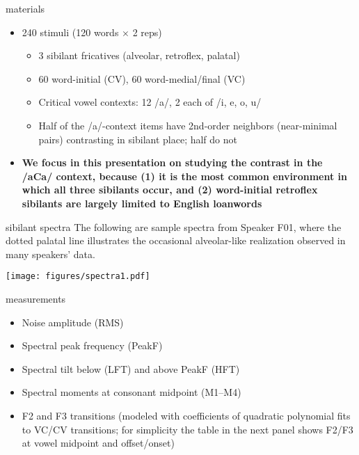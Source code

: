 \documentclass[serif, mathserif, final, xcolor=table]{beamer}
\begin{document}
\begin{frame}[t]{}
\begin{columns}[t]
\begin{column}{0.24\linewidth}
      \begin{block}{materials}
        \small
        \begin{itemize}
          \item 240 stimuli (120 words $\times$ 2 reps)
            \begin{itemize}
              \item 3 sibilant fricatives (alveolar, retroflex, palatal)
              \item 60 word-initial (CV), 60 word-medial/final (VC)
              \item Critical vowel contexts: 12 /a/, 2 each of /i, e, o, u/
              \item Half of the /a/-context items have 2nd-order neighbors (near-minimal pairs) contrasting in sibilant place; half do not
            \end{itemize}
          \item \textbf{We focus in this presentation on studying the contrast in the /aCa/ context, because (1) it is the most common environment in which all three sibilants occur, and (2) word-initial retroflex sibilants are largely limited to English loanwords}
        \end{itemize}
      \end{block}

      \begin{block}{sibilant spectra}
        \small
        The following are sample spectra from Speaker F01, where the dotted 
palatal line illustrates the occasional alveolar-like realization observed 
in many speakers' data.

        \bigskip

        \begin{center}
          \texttt{[image: figures/spectra1.pdf]}
        \end{center}
      \end{block}

      \begin{block}{measurements}
        
        \begin{itemize}
          \item Noise amplitude (RMS)
          \item Spectral peak frequency (PeakF)
          \item Spectral tilt below (LFT) and above PeakF (HFT)
          \item Spectral moments at consonant midpoint (M1--M4)
          \item F2 and F3 transitions (modeled with coefficients of quadratic polynomial fits to VC/CV transitions; for simplicity the table in the next panel shows F2/F3 at vowel midpoint and offset/onset)
        \end{itemize}
      \end{block}


\end{column}
\end{columns}
\end{frame}
\end{document}
